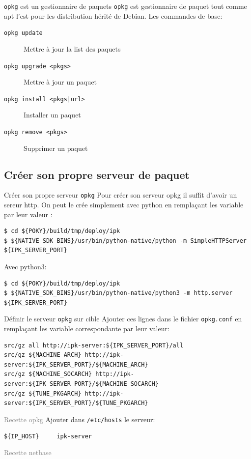 \documentclass[compress]{beamer}
\begin{document}
\begin{frame}{\texttt{opkg} est un gestionnaire de paquets}
\texttt{opkg} est gestionnaire de paquet tout comme apt l'est pour les distribution hérité de Debian.\newline
\newline
Les commandes de base:
\begin{description}
	\item[\texttt{opkg update}] Mettre à jour la list des paquets
	\item[\texttt{opkg upgrade <pkgs>}] Mettre à jour un paquet
	\item[\texttt{opkg install <pkgs|url>}] Installer un paquet
	\item[\texttt{opkg remove <pkgs>}] Supprimer un paquet
\end{description}
\end{frame}

\subsection{Créer son propre serveur de paquet}

\begin{frame}[fragile]{Créer son propre serveur \texttt{opkg}}
Pour créer son serveur opkg il suffit d'avoir un sereur http.\newline
On peut le crée simplement avec python en remplaçant les variable par leur valeur :
\begin{lstlisting}[style=shell]
$ cd ${POKY}/build/tmp/deploy/ipk
$ ${NATIVE_SDK_BINS}/usr/bin/python-native/python -m SimpleHTTPServer ${IPK_SERVER_PORT}
\end{lstlisting}
Avec python3:
\begin{lstlisting}[style=shell]
$ cd ${POKY}/build/tmp/deploy/ipk
$ ${NATIVE_SDK_BINS}/usr/bin/python-native/python3 -m http.server ${IPK_SERVER_PORT}
\end{lstlisting}
\end{frame}

\begin{frame}[fragile]{Définir le serveur \texttt{opkg} sur cible}
Ajouter ces lignes dans le fichier \texttt{opkg.conf} en remplaçant les variable correspondante par leur valeur:
\begin{lstlisting}[style=shell,xleftmargin=-18px,xrightmargin=-18px]
src/gz all http://ipk-server:${IPK_SERVER_PORT}/all
src/gz ${MACHINE_ARCH} http://ipk-server:${IPK_SERVER_PORT}/${MACHINE_ARCH} 
src/gz ${MACHINE_SOCARCH} http://ipk-server:${IPK_SERVER_PORT}/${MACHINE_SOCARCH}
src/gz ${TUNE_PKGARCH} http://ipk-server:${IPK_SERVER_PORT}/${TUNE_PKGARCH}
\end{lstlisting}
\textcolor{gray}{\tiny{Recette opkg}}
\newline
Ajouter dans \texttt{/etc/hosts} le serveur:
\begin{lstlisting}[style=shell]
${IP_HOST}     ipk-server
\end{lstlisting}
\textcolor{gray}{\tiny{Recette netbase}}
\end{frame}
\end{document}
